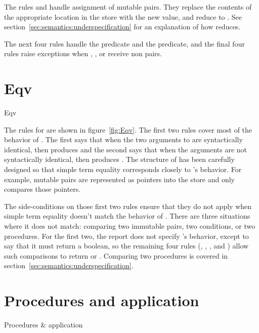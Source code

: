 The rules  and  handle assignment of mutable pairs. 
They replace the contents of the appropriate location in the store with the new value, and reduce to . See section~\ref{sec:semantics:underspecification} for an explanation of how  reduces.

The next four rules handle the  predicate and the  predicate, and the final four rules raise exceptions when , ,  or  receive non pairs.

\section{Eqv}

\beginfig
\begin{center}

\end{center}
\caption{Eqv}\label{fig:Eqv}
\endfig

The rules for  are shown in figure~\ref{fig:Eqv}. The first two rules cover most of the behavior of . 
The first says that when the two arguments to  are syntactically identical, then  produces \semtrue{} and the second says that when the arguments are not syntactically identical, then  produces \semfalse{}. 
The structure of  has been carefully designed so that simple term equality corresponds closely to 's behavior. 
For example, mutable pairs are represented as pointers into the store and  only compares those pointers.

The side-conditions on those first two rules ensure that they do not apply when simple term equality doesn't match the behavior of . There are three situations where it does not match: comparing two immutable pairs, two conditions, or two procedures. For the first two, the report does not specify 's behavior, except to say that it must return a boolean, so the remaining four rules (, , , and ) allow such comparisons to return \semtrue{} or \semfalse{}. Comparing two procedures is covered in section~\ref{sec:semantics:underspecification}. 

\section{Procedures and application}

\subfigurestart{}
\beginfig
\begin{center}

\end{center}
\caption{Procedures \& application}\label{fig:Procedure--application}
\endfig

